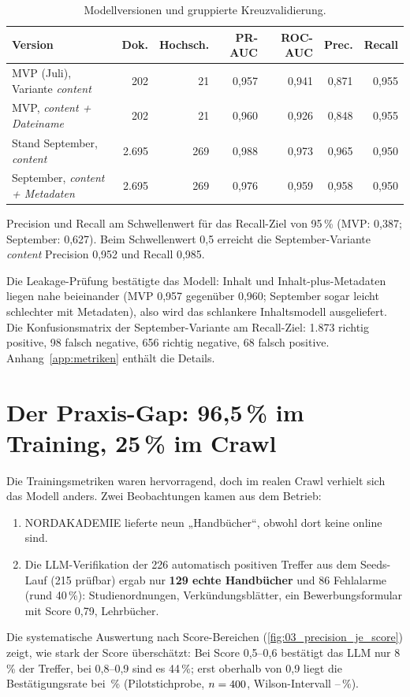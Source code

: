 \begin{table}[htbp]
\centering\small
\caption{Modellversionen und gruppierte Kreuzvalidierung.}\label{tab:modelle}
\begin{tabular}{@{}l r r r r r r@{}}
\toprule
\textbf{Version} & \textbf{Dok.} & \textbf{Hochsch.} & \textbf{PR-AUC} & \textbf{ROC-AUC} & \textbf{Prec.} & \textbf{Recall} \\
\midrule
MVP (Juli), Variante \emph{content} & 202 & 21 & 0,957 & 0,941 & 0,871 & 0,955 \\
MVP, \emph{content + Dateiname} & 202 & 21 & 0,960 & 0,926 & 0,848 & 0,955 \\
Stand September, \emph{content} & 2.695 & 269 & 0,988 & 0,973 & 0,965 & 0,950 \\
September, \emph{content + Metadaten} & 2.695 & 269 & 0,976 & 0,959 & 0,958 & 0,950 \\
\bottomrule
\end{tabular}
\par\smallskip\footnotesize Precision und Recall am Schwellenwert für das Recall-Ziel von 95\,\% (MVP: 0,387; September: 0,627). Beim Schwellenwert 0,5 erreicht die September-Variante \emph{content} Precision 0,952 und Recall 0,985.
\end{table}

Die Leakage-Prüfung bestätigte das Modell: Inhalt und Inhalt-plus-Metadaten liegen nahe beieinander (MVP 0,957 gegenüber 0,960; September sogar leicht schlechter mit Metadaten), also wird das schlankere Inhaltsmodell ausgeliefert. Die Konfusionsmatrix der September-Variante am Recall-Ziel: 1.873 richtig positive, 98 falsch negative, 656 richtig negative, 68 falsch positive. Anhang~\ref{app:metriken} enthält die Details.

\section{Der Praxis-Gap: 96,5\,\% im Training, 25\,\% im Crawl}
Die Trainingsmetriken waren hervorragend, doch im realen Crawl verhielt sich das Modell anders. Zwei Beobachtungen kamen aus dem Betrieb:
\begin{enumerate}
  \item NORDAKADEMIE lieferte neun „Handbücher“, obwohl dort keine online sind.
  \item Die LLM-Verifikation der 226 automatisch positiven Treffer aus dem Seeds-Lauf (215 prüfbar) ergab nur \textbf{129 echte Handbücher} und 86 Fehlalarme (rund 40\,\%): Studienordnungen, Verkündungsblätter, ein Bewerbungsformular mit Score 0,79, Lehrbücher.
\end{enumerate}
Die systematische Auswertung nach Score-Bereichen (\cref{fig:03_precision_je_score}) zeigt, wie stark der Score überschätzt: Bei Score 0,5--0,6 bestätigt das LLM nur 8\,\% der Treffer, bei 0,8--0,9 sind es 44\,\%; erst oberhalb von 0,9 liegt die Bestätigungsrate bei \zPilotPct{}\,\% (Pilotstichprobe, $n=400{}$, Wilson-Intervall \zPilotLo{}--\zPilotHi{}\,\%).

